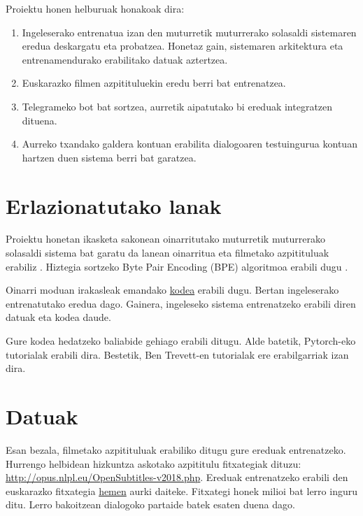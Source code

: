 \documentclass[11pt,a4paper]{article}
\begin{document}
Proiektu honen helburuak honakoak dira:
\begin{enumerate}
    \item Ingeleserako entrenatua izan den muturretik muturrerako
solasaldi sistemaren eredua deskargatu eta probatzea. Honetaz gain, sistemaren arkitektura eta entrenamendurako erabilitako datuak aztertzea.

\item Euskarazko filmen azpitituluekin eredu berri bat entrenatzea.

\item Telegrameko bot bat sortzea, aurretik aipatutako bi ereduak integratzen dituena.

\item  Aurreko txandako galdera kontuan erabilita dialogoaren testuingurua kontuan hartzen duen sistema berri bat garatzea.

\end{enumerate}

\section{Erlazionatutako lanak}

Proiektu honetan ikasketa sakonean oinarritutako muturretik muturrerako solasaldi sistema bat garatu da \citep{bahdanau2014neural} lanean oinarritua eta filmetako azpitituluak erabiliz \citep{lison2016opensubtitles2016}. Hiztegia sortzeko Byte Pair Encoding (BPE) algoritmoa erabili dugu \citep{sennrich2015neural}.

Oinarri moduan irakasleak emandako  \href{https://drive.google.com/drive/folders/1a6JIZ96fupi8gHxYf5ytgkBc9zenJtQU}{kodea} erabili dugu. Bertan ingeleserako entrenatutako eredua dago. Gainera, ingeleseko sistema entrenatzeko erabili diren datuak eta kodea daude.

Gure kodea hedatzeko baliabide gehiago erabili ditugu. Alde batetik, Pytorch-eko tutorialak erabili dira. Bestetik, Ben Trevett-en tutorialak ere erabilgarriak izan dira.

\section{Datuak}

Esan bezala, filmetako azpitituluak erabiliko ditugu gure ereduak entrenatzeko. Hurrengo helbidean hizkuntza askotako azpititulu fitxategiak dituzu: \href{http://opus.nlpl.eu/OpenSubtitles-v2018.php}{http://opus.nlpl.eu/OpenSubtitles-v2018.php}. Ereduak entrenatzeko erabili den euskarazko fitxategia \href{http://opus.nlpl.eu/download.php?f=OpenSubtitles/v2018/mono/OpenSubtitles.raw.eu.gz}{hemen} aurki daiteke. Fitxategi honek milioi bat lerro inguru ditu. Lerro bakoitzean dialogoko partaide batek esaten duena dago.
\end{document}
